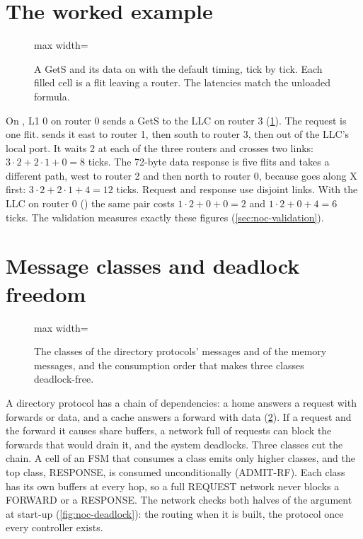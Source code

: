 \section{The worked example}\label{sec:noc-example}

\begin{figure}[htbp]\centering
\begin{adjustbox}{max width=\textwidth}\end{adjustbox}
\caption{A GetS and its data on  with the default timing, tick by
tick. Each filled cell is a flit leaving a router. The latencies match the unloaded formula.}
\label{fig:noc-example}
\end{figure}

On , L1 0 on router 0 sends a GetS to the LLC on router 3
(\cref{fig:noc-example}). The request is one flit.  sends it east to router 1, then
south to router 3, then out of the LLC's local port. It waits  2 at each of
the three routers and crosses two links: $3\cdot 2 + 2\cdot 1 + 0 = 8$ ticks. The 72-byte data
response is five flits and takes a different path, west to router 2 and then north to router 0,
because  goes along X first: $3\cdot 2 + 2\cdot 1 + 4 = 12$ ticks. Request and response
use disjoint links. With the LLC on router 0 () the same
pair costs $1\cdot 2 + 0 + 0 = 2$ and $1\cdot 2 + 0 + 4 = 6$ ticks. The validation measures exactly
these figures (\cref{sec:noc-validation}).

\section{Message classes and deadlock freedom}\label{sec:noc-deadlock}

\begin{figure}[htbp]\centering
\begin{adjustbox}{max width=\textwidth}\end{adjustbox}
\caption{The classes of the directory protocols' messages and of the memory messages, and the
consumption order that makes three classes deadlock-free.}
\label{fig:noc-classes}
\end{figure}

A directory protocol has a chain of dependencies: a home answers a request with forwards or data,
and a cache answers a forward with data (\cref{fig:noc-classes}). If a request and the forward it
causes share buffers, a network full of requests can block the forwards that would drain it, and
the system deadlocks. Three classes cut the chain. A cell of an FSM that consumes a class emits
only higher classes, and the top class, RESPONSE, is consumed unconditionally (ADMIT-RF). Each
class has its own buffers at every hop, so a full REQUEST network never blocks a FORWARD or a
RESPONSE. The network checks both halves of the argument at start-up (\cref{fig:noc-deadlock}): the
routing when it is built, the protocol once every controller exists.

